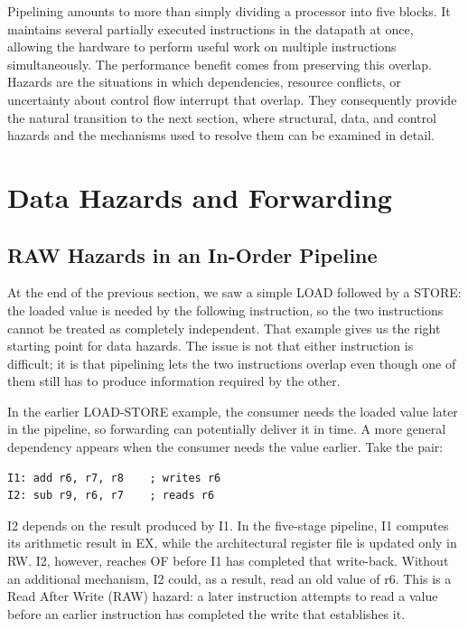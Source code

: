 \documentclass[12pt,a4paper]{report}
\begin{document}
Pipelining amounts to more than simply dividing a processor into five blocks. It maintains several partially executed instructions in the datapath at once, allowing the hardware to perform useful work on multiple instructions simultaneously. The performance benefit comes from preserving this overlap. Hazards are the situations in which dependencies, resource conflicts, or uncertainty about control flow interrupt that overlap. They consequently provide the natural transition to the next section, where structural, data, and control hazards and the mechanisms used to resolve them can be examined in detail.~\cite{marz-pipelining} ~\cite{hennessy}

\section{Data Hazards and Forwarding}
\label{sec:data-hazards}

\subsection{RAW Hazards in an In-Order Pipeline}

At the end of the previous section, we saw a simple LOAD followed by a STORE: the loaded value is needed by the following instruction, so the two instructions cannot be treated as completely independent. That example gives us the right starting point for data hazards. The issue is not that either instruction is difficult; it is that pipelining lets the two instructions overlap even though one of them still has to produce information required by the other.

In the earlier LOAD-STORE example, the consumer needs the loaded value later in the pipeline, so forwarding can potentially deliver it in time. A more general dependency appears when the consumer needs the value earlier. Take the pair:

\begin{lstlisting}[caption={A RAW hazard: I2 reads a register I1 has just written},label={lst:raw-hazard}]
I1: add r6, r7, r8    ; writes r6
I2: sub r9, r6, r7    ; reads r6
\end{lstlisting}

I2 depends on the result produced by I1. In the five-stage pipeline, I1 computes its arithmetic result in EX, while the architectural register file is updated only in RW. I2, however, reaches OF before I1 has completed that write-back. Without an additional mechanism, I2 could, as a result, read an old value of r6. This is a Read After Write (RAW) hazard: a later instruction attempts to read a value before an earlier instruction has completed the write that establishes it.
\end{document}
